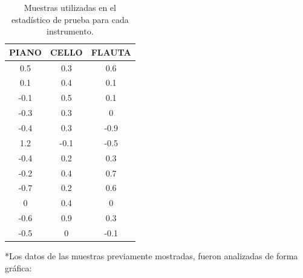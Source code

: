 \begin{table}[H]
    \begin{center}
        \begin{tabular}{ |ccc| }
            \hline
                \textbf{PIANO} & \textbf{CELLO} & \textbf{FLAUTA} \\
            \hline
                0.5 & 0.3 & 0.6 \\
                0.1 & 0.4 & 0.1 \\
                -0.1 & 0.5 & 0.1 \\
                -0.3 & 0.3 & 0 \\
                -0.4 & 0.3 & -0.9 \\
                1.2 & -0.1 & -0.5 \\
                -0.4 & 0.2 & 0.3 \\
                -0.2 & 0.4 & 0.7 \\
                -0.7 & 0.2 & 0.6 \\
                0 & 0.4 & 0 \\
                -0.6 & 0.9 & 0.3 \\
                -0.5 & 0 & -0.1 \\
            \hline
        \end{tabular}
        \caption{Muestras utilizadas en el estadístico de prueba para cada instrumento. }
    \end{center}
\end{table}


*Los datos de las muestras previamente mostradas, fueron analizadas de forma gráfica: 
